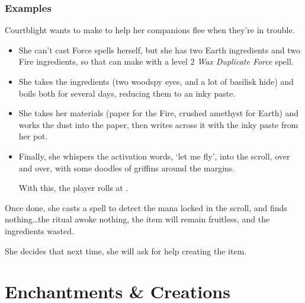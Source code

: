 \begin{multicols}{2}
\subsubsection*{Examples}

\begin{exampletext}
Courtblight wants to make  to help her companions flee when they're in trouble.

\begin{itemize}
  \item
  She can't cast Force spells herself, but she has two Earth \glspl{ingredient} and two Fire \glspl{ingredient}, so that can make  with a level 2 \textit{Wax Duplicate Force} spell.
  \item
  She takes the \glspl{ingredient} (two woodspy eyes, and a lot of basilisk hide) and boils both for several days, reducing them to an inky paste.
  \item
  She takes her materials (paper for the Fire, crushed amethyst for Earth) and works the dust into the paper, then writes across it with the inky paste from her pot.
  \item
  Finally, she whispers the activation words, `let me fly', into the scroll, over and over, with some doodles of griffins around the margins.

  With this, the player rolls  at \tn[14].
\end{itemize}

Once done, she casts a spell to detect the mana locked in the scroll, and finds nothing\ldots the ritual awoke nothing, the item will remain fruitless, and the \glspl{ingredient} wasted.

She decides that next time, she will ask for help creating the item.

\end{exampletext}

\end{multicols}

\section{Enchantments \& Creations}
\label{magicalMinds}

